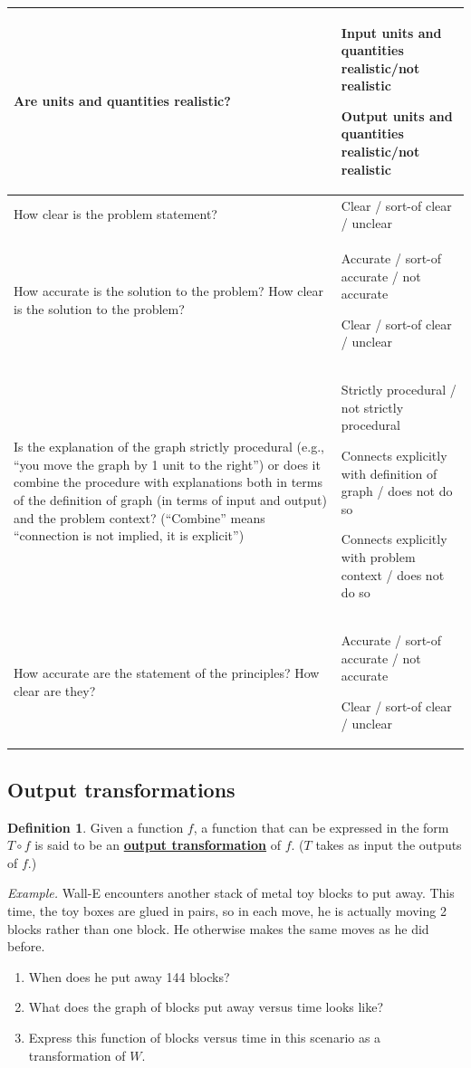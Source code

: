 \documentclass[11pt]{article}
\renewcommand\emph[1]{\underline{\bf{#1}}} %
\theoremstyle{definition}
\newtheorem{definition}[theorem]{Definition}
\begin{document}
\hspace*{-0.25in}\begin{tabular}{L{2.3in}|L{4.5in}}
\hline 
Are units and quantities realistic? 
	& 
	Input units and quantities realistic/not realistic
	
	Output units and quantities realistic/not realistic
\\ 
\hline
How clear is the problem statement?
	& 
	Clear / sort-of clear / unclear 
\\ 
\hline
How accurate is the solution to the problem? How clear is the solution to the problem?
	& 
	Accurate / sort-of accurate / not accurate  
	
	Clear / sort-of clear / unclear 
\\ 
\hline
Is the explanation of the graph strictly procedural (e.g., ``you move the graph by 1 unit to the right'') or does it combine the procedure with explanations both in terms of the definition of graph (in terms of input and output) and the problem context? (``Combine'' means ``connection is not implied, it is explicit'')
	&
	Strictly procedural / not strictly procedural 
	
	Connects explicitly with definition of graph / does not do so 
	
	Connects explicitly with problem context  / does not do so \\
\hline
How accurate are the statement of the principles? How clear are they? 
	& Accurate / sort-of accurate / not accurate  
	
	Clear / sort-of clear / unclear  \\ 
\hline
\end{tabular}

\subsection{Output transformations}

\begin{definition}
Given a function $f$, a function that can be expressed in the form $T\circ f$ is said to be an \emph{output transformation} of $f$. ($T$ takes as input the outputs of $f$.)
\end{definition}

{\it Example.} Wall-E encounters another stack of metal toy blocks to put away. This time, the toy boxes are glued in pairs, so in each move, he is actually moving 2 blocks rather than one block.  He otherwise makes the same moves as he did before. 
\begin{enumerate}[label=(\alph*)]
\item When does he put away 144 blocks?
\item What does the graph of blocks put away versus time looks like?
\item Express this function of blocks versus time in this scenario as a transformation of $W$.
\end{enumerate}
\end{document}
